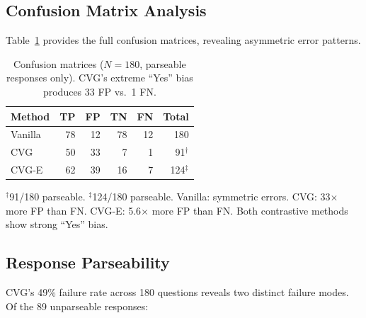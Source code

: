 \documentclass[10pt,twocolumn]{article}
\begin{document}
\subsection{Confusion Matrix Analysis}

Table~\ref{tab:confusion} provides the full confusion matrices, revealing asymmetric error patterns.

\begin{table}[h]
\centering
\caption{Confusion matrices ($N{=}180$, parseable responses only). CVG's extreme ``Yes'' bias produces 33 FP vs.\ 1 FN.}
\label{tab:confusion}
\small
\begin{tabular}{lrrrr|r}
\toprule
Method & TP & FP & TN & FN & Total \\
\midrule
Vanilla & 78 & 12 & 78 & 12 & 180 \\
CVG & 50 & 33 & 7 & 1 & 91$^\dagger$ \\
CVG-E & 62 & 39 & 16 & 7 & 124$^\ddagger$ \\
\bottomrule
\end{tabular}

\vspace{3pt}
{\scriptsize $^\dagger$91/180 parseable. $^\ddagger$124/180 parseable. Vanilla: symmetric errors. CVG: 33$\times$ more FP than FN. CVG-E: 5.6$\times$ more FP than FN. Both contrastive methods show strong ``Yes'' bias.}
\end{table}

\subsection{Response Parseability}
\label{sec:coherence}

\begin{table}[h]
\centering
\caption{Response parseability and failure modes across methods.}
\label{tab:parse}
\small
{}
\end{table}

CVG's 49\% failure rate across 180 questions reveals two distinct failure modes. Of the 89 unparseable responses:
\end{document}
